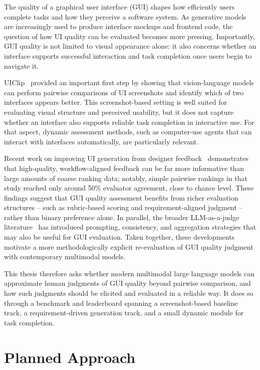 \documentclass[pdflatex,sn-mathphys-num]{sn-jnl}
\begin{document}
The quality of a graphical user interface (GUI) shapes how efficiently users complete
tasks and how they perceive a software system. As generative models are increasingly
used to produce interface mockups and frontend code, the question of how UI quality can
be evaluated becomes more pressing. Importantly, GUI quality is not limited to visual
appearance alone: it also concerns whether an interface supports successful interaction
and task completion once users begin to navigate it.

UIClip~\cite{uiclip} provided an important first step by showing that vision-language
models can perform pairwise comparisons of UI screenshots and identify which of two
interfaces appears better. This screenshot-based setting is well suited for evaluating
visual structure and perceived usability, but it does not capture whether an interface
also supports reliable task completion in interactive use. For that aspect, dynamic
assessment methods, such as computer-use agents that can interact with interfaces
automatically, are particularly relevant.

Recent work on improving UI generation from designer feedback~\cite{designer_feedback}
demonstrates that high-quality, workflow-aligned feedback can be far more informative
than large amounts of coarse ranking data; notably, simple pairwise rankings in that
study reached only around 50\% evaluator agreement, close to chance level. These
findings suggest that GUI quality assessment benefits from richer evaluation
structures -- such as rubric-based scoring and requirement-aligned judgment -- rather
than binary preference alone. In parallel, the broader LLM-as-a-judge
literature~\cite{llm_judge} has introduced prompting, consistency, and aggregation
strategies that may also be useful for GUI evaluation. Taken together, these
developments motivate a more methodologically explicit re-evaluation of GUI quality
judgment with contemporary multimodal models.

This thesis therefore asks whether modern multimodal large language models can
approximate human judgments of GUI quality beyond pairwise comparison, and how such
judgments should be elicited and evaluated in a reliable way. It does so through a
benchmark and leaderboard spanning a screenshot-based baseline track, a
requirement-driven generation track, and a small dynamic module for task completion.

\section{Planned Approach}\label{sec:approach}
\end{document}
